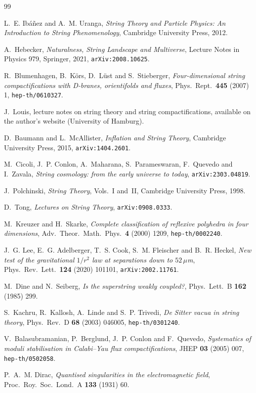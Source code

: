 \documentclass[11pt,a4paper,oneside]{report}
\numberwithin{equation}{chapter}
\begin{document}
\renewcommand{\bibname}{References}
\begin{thebibliography}{99}

L.~E. Ibáñez and A.~M. Uranga, \emph{String Theory and Particle Physics: An Introduction to String Phenomenology}, Cambridge University Press, 2012.

A.~Hebecker, \emph{Naturalness, String Landscape and Multiverse}, Lecture Notes in Physics 979, Springer, 2021, \texttt{arXiv:2008.10625}.

R.~Blumenhagen, B.~Körs, D.~Lüst and S.~Stieberger, \emph{Four-dimensional string compactifications with D-branes, orientifolds and fluxes}, Phys.\ Rept.\ \textbf{445} (2007) 1, \texttt{hep-th/0610327}.

J.~Louis, lecture notes on string theory and string compactifications, available on the author's website (University of Hamburg).

D.~Baumann and L.~McAllister, \emph{Inflation and String Theory}, Cambridge University Press, 2015, \texttt{arXiv:1404.2601}.

M.~Cicoli, J.~P. Conlon, A.~Maharana, S.~Parameswaran, F.~Quevedo and I.~Zavala, \emph{String cosmology: from the early universe to today}, \texttt{arXiv:2303.04819}.

J.~Polchinski, \emph{String Theory}, Vols.~I and~II, Cambridge University Press, 1998.

D.~Tong, \emph{Lectures on String Theory}, \texttt{arXiv:0908.0333}.

M.~Kreuzer and H.~Skarke, \emph{Complete classification of reflexive polyhedra in four dimensions}, Adv.\ Theor.\ Math.\ Phys.\ \textbf{4} (2000) 1209, \texttt{hep-th/0002240}.

J.~G. Lee, E.~G. Adelberger, T.~S. Cook, S.~M. Fleischer and B.~R. Heckel, \emph{New test of the gravitational $1/r^2$ law at separations down to $52\,\mu$m}, Phys.\ Rev.\ Lett.\ \textbf{124} (2020) 101101, \texttt{arXiv:2002.11761}.

M.~Dine and N.~Seiberg, \emph{Is the superstring weakly coupled?}, Phys.\ Lett.\ B \textbf{162} (1985) 299.

S.~Kachru, R.~Kallosh, A.~Linde and S.~P. Trivedi, \emph{De Sitter vacua in string theory}, Phys.\ Rev.\ D \textbf{68} (2003) 046005, \texttt{hep-th/0301240}.

V.~Balasubramanian, P.~Berglund, J.~P. Conlon and F.~Quevedo, \emph{Systematics of moduli stabilisation in Calabi--Yau flux compactifications}, JHEP \textbf{03} (2005) 007, \texttt{hep-th/0502058}.

P.~A.~M. Dirac, \emph{Quantised singularities in the electromagnetic field}, Proc.\ Roy.\ Soc.\ Lond.\ A \textbf{133} (1931) 60.

\end{thebibliography}
\end{document}
